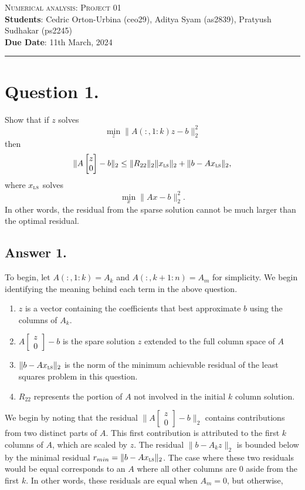 \documentclass[12pt]{article}
\newcommand{\ls}{\textsc{ls}}
\begin{document}
\noindent
\textsc{\Large Numerical analysis: Project 01} \\ 
\noindent \textbf{Students}:
Cedric Orton-Urbina (ceo29),
Aditya Syam (as2839),
Pratyush Sudhakar (ps2245)
\\
\noindent
\textbf{Due Date}: 11th March, 2024
\\

\hrule

\section*{Question 1.}
Show that if $z$ solves 
\[
    \min_{z} \|A(:,1:k)z - b\|_2^2 
\]
then 
\[
    \|A\begin{bmatrix}z \\ 0\end{bmatrix}-b\|_2 \leq \|R_{22}\|_2\|x_{\ls}\|_2 + \|b-Ax_{\ls}\|_2,
\]
where $x_{\ls}$ solves 
\[
    \min_{x} \|Ax - b\|_2^2. 
\]
In other words, the residual from the sparse solution cannot be much larger than the optimal residual. 

\subsection*{Answer 1.}

To begin, let $A(:, 1:k) = A_k$ and $A(:, k+1:n) = A_m$ for simplicity. We begin identifying the meaning behind each term in the above question. 

\begin{enumerate}
    \item $z$ is a vector containing the coefficients that best approximate $b$ using the columns of $A_k$.
          
    \item $A\begin{bmatrix}z \\ 0\end{bmatrix}-b$ is the spare solution $z$ extended to the full column space of $A$
          
    \item $\|b-Ax_{\ls}\|_2$ is the norm of the minimum achievable residual of the least squares problem in this question.
          
    \item $R_{22}$ represents the portion of $A$ not involved in the initial $k$ column solution.
\end{enumerate}

We begin by noting that the residual $\|A\begin{bmatrix}z \\ 0\end{bmatrix}-b\|_2$ contains contributions from two distinct parts of $A$. This first contribution is attributed to the first $k$ columns of $A$, which are scaled by $z$. The residual $\| b - A_k z\|_2$ is bounded below by the minimal residual $r_{min} = \|b-Ax_{\ls}\|_2$. The case where these two residuals would be equal corresponds to an $A$ where all other columns are $0$ aside from the first $k$. In other words, these residuals are equal when $A_m = 0$, but otherwise, 
\end{document}
